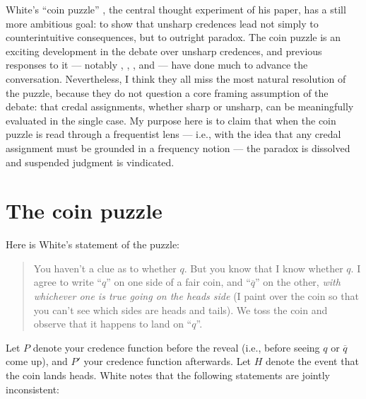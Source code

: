 \documentclass[letterpaper,12pt]{article}
\begin{document}
White's ``coin puzzle'' \citeyearpar[175]{White2009-WHIESA}, the central thought experiment of his paper, has a still more ambitious goal: to show that unsharp credences lead not simply to counterintuitive consequences, but to outright paradox. The coin puzzle is an exciting development in the debate over unsharp credences, and previous responses to it --- notably \cite{Joyce2010-JOYADO-2}, \cite{rayo2011puzzle}, \cite{dodd2013roger}, and \cite{bradley2013coins} --- have done much to advance the conversation. Nevertheless, I think they all miss the most natural resolution of the puzzle, because they do not question a core framing assumption of the debate: that credal assignments, whether sharp or unsharp, can be meaningfully evaluated in the single case. My purpose here is to claim that when the coin puzzle is read through a frequentist lens --- i.e., with the idea that any credal assignment must be grounded in a frequency notion --- the paradox is dissolved and suspended judgment is vindicated.


\section{The coin puzzle}
Here is White's statement of the puzzle:
\begin{quotation}
You haven't a clue as to whether $q$. But you know that I know whether $q$. I agree to write ``$q$'' on one side of a fair coin, and ``$\overline{q}$'' on the other, \emph{with whichever one is true going on the heads side} (I paint over the coin so that you can't see which sides are heads and tails). We toss the coin and observe that it happens to land on ``$q$''.
\end{quotation}

Let $P$ denote your credence function before the reveal (i.e., before seeing $q$ or $\overline{q}$ come up), and $P'$ your credence function afterwards. Let $H$ denote the event that the coin lands heads. White notes that the following statements are jointly inconsistent:
\end{document}
